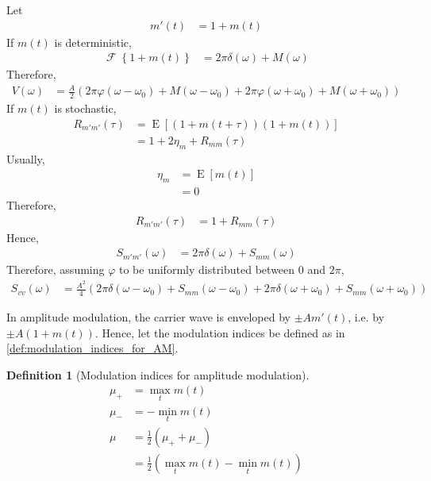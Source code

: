 \documentclass[titlepage, fleqn, a4paper, 12pt, twoside]{article}
\theoremstyle{definition}
\newtheorem{definition}{Definition}
\theoremstyle{theorem}
\DeclareMathOperator{\expct}{\mathrm{E}}
\DeclareMathOperator{\FT}{\mathcal{F}}
\begin{document}
Let
\begin{align*}
	m'(t) &= 1 + m(t)
\end{align*}
If $m(t)$ is deterministic,
\begin{align*}
	\FT\left\{ 1 + m(t) \right\} &= 2 \pi \delta(\omega) + M(\omega)
\end{align*}
Therefore,
\begin{align*}
	V(\omega) &= \frac{A}{2} \left( 2 \pi \varphi(\omega - \omega_0) + M(\omega - \omega_0) + 2 \pi \varphi(\omega + \omega_0) + M(\omega + \omega_0) \right)
\end{align*}
If $m(t)$ is stochastic,
\begin{align*}
	R_{m' m'}(\tau) &= \expct\left[ \left( 1 + m(t + \tau) \right) \left( 1 + m(t) \right) \right]\\
	&= 1 + 2 \eta_m + R_{m m}(\tau)
\end{align*}
Usually,
\begin{align*}
	\eta_m &= \expct\left[ m(t) \right]\\
	&= 0
\end{align*}
Therefore,
\begin{align*}
	R_{m' m'}(\tau) &= 1 + R_{m m}(\tau)
\end{align*}
Hence,
\begin{align*}
	S_{m' m'}(\omega) &= 2 \pi \delta(\omega) + S_{m m}(\omega)
\end{align*}
Therefore, assuming $\varphi$ to be uniformly distributed between $0$ and $2 \pi$,
\begin{align*}
	S_{v v}(\omega) &= \frac{A^2}{4} \left( 2 \pi \delta(\omega - \omega_0) + S_{m m}(\omega - \omega_0) + 2 \pi \delta (\omega + \omega_0) + S_{m m}(\omega + \omega_0) \right)
\end{align*}

In amplitude modulation, the carrier wave is enveloped by $\pm A m'(t)$, i.e. by $\pm A \left( 1 + m(t) \right)$.
Hence, let the modulation indices be defined as in \cref{def:modulation_indices_for_AM}.

\begin{definition}[Modulation indices for amplitude modulation]
	\begin{align*}
		\mu_+ &= \max_{t} m(t)\\
		\mu_- &= -\min_{t} m(t)\\
		\mu &= \frac{1}{2} \left( \mu_+ + \mu_- \right)\\
		&= \frac{1}{2} \left( \max_{t} m(t) - \min_{t} m(t) \right)
	\end{align*}
\end{definition}
\end{document}
